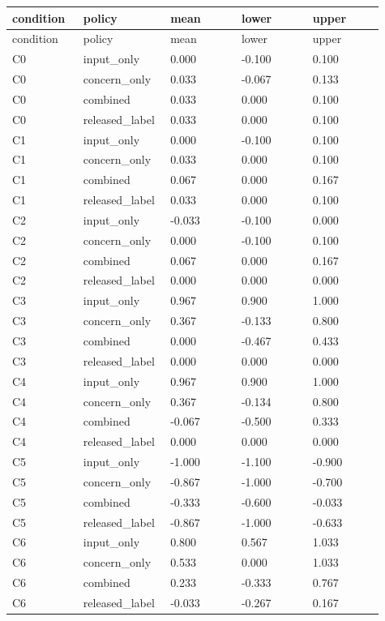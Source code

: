\documentclass[11pt,a4paper]{article}
\begin{document}
\begingroup\scriptsize
\begin{longtable}{p{0.182\linewidth}p{0.182\linewidth}p{0.182\linewidth}p{0.182\linewidth}p{0.182\linewidth}}
\toprule
condition & policy & mean & lower & upper \\
\midrule
\endfirsthead
\toprule
condition & policy & mean & lower & upper \\
\midrule
\endhead
C0 & input\_\allowbreak{}only & 0.000 & -0.100 & 0.100 \\
C0 & concern\_\allowbreak{}only & 0.033 & -0.067 & 0.133 \\
C0 & combined & 0.033 & 0.000 & 0.100 \\
C0 & released\_\allowbreak{}label & 0.033 & 0.000 & 0.100 \\
C1 & input\_\allowbreak{}only & 0.000 & -0.100 & 0.100 \\
C1 & concern\_\allowbreak{}only & 0.033 & 0.000 & 0.100 \\
C1 & combined & 0.067 & 0.000 & 0.167 \\
C1 & released\_\allowbreak{}label & 0.033 & 0.000 & 0.100 \\
C2 & input\_\allowbreak{}only & -0.033 & -0.100 & 0.000 \\
C2 & concern\_\allowbreak{}only & 0.000 & -0.100 & 0.100 \\
C2 & combined & 0.067 & 0.000 & 0.167 \\
C2 & released\_\allowbreak{}label & 0.000 & 0.000 & 0.000 \\
C3 & input\_\allowbreak{}only & 0.967 & 0.900 & 1.000 \\
C3 & concern\_\allowbreak{}only & 0.367 & -0.133 & 0.800 \\
C3 & combined & 0.000 & -0.467 & 0.433 \\
C3 & released\_\allowbreak{}label & 0.000 & 0.000 & 0.000 \\
C4 & input\_\allowbreak{}only & 0.967 & 0.900 & 1.000 \\
C4 & concern\_\allowbreak{}only & 0.367 & -0.134 & 0.800 \\
C4 & combined & -0.067 & -0.500 & 0.333 \\
C4 & released\_\allowbreak{}label & 0.000 & 0.000 & 0.000 \\
C5 & input\_\allowbreak{}only & -1.000 & -1.100 & -0.900 \\
C5 & concern\_\allowbreak{}only & -0.867 & -1.000 & -0.700 \\
C5 & combined & -0.333 & -0.600 & -0.033 \\
C5 & released\_\allowbreak{}label & -0.867 & -1.000 & -0.633 \\
C6 & input\_\allowbreak{}only & 0.800 & 0.567 & 1.033 \\
C6 & concern\_\allowbreak{}only & 0.533 & 0.000 & 1.033 \\
C6 & combined & 0.233 & -0.333 & 0.767 \\
C6 & released\_\allowbreak{}label & -0.033 & -0.267 & 0.167 \\
\bottomrule
\end{longtable}
\endgroup
\end{document}
